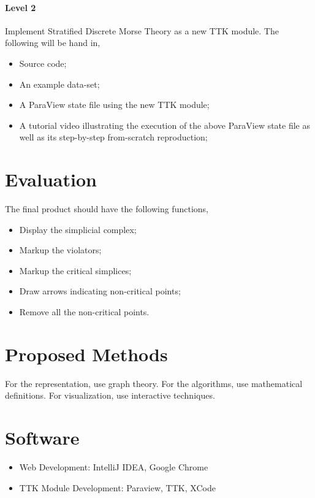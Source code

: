 \documentclass[12pt]{article}
\begin{document}
\paragraph{Level 2} Implement Stratified Discrete Morse Theory as a new TTK module. The following will be hand in,
\begin{itemize}
\item Source code;
\item An example data-set;
\item A ParaView state file using the new TTK module;
\item A tutorial video illustrating the execution of the above ParaView state file as well as its step-by-step from-scratch reproduction;
\end{itemize}

\section{Evaluation}
The final product should have the following functions,
\begin{itemize}
\item Display the simplicial complex;
\item Markup the violators;
\item Markup the critical simplices;
\item Draw arrows indicating non-critical points;
\item Remove all the non-critical points.
\end{itemize}

\section{Proposed Methods}
For the representation, use graph theory. For the algorithms, use mathematical definitions. For visualization, use interactive techniques.

\section{Software}
\begin{itemize}
\item Web Development: IntelliJ IDEA, Google Chrome
\item TTK Module Development: Paraview, TTK, XCode
\end{itemize}
\end{document}
